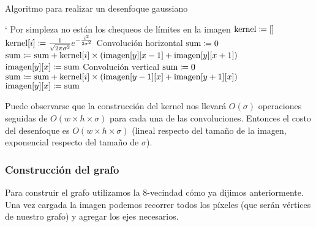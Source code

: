 \begin{algorithm}[H]
\caption{Algoritmo para realizar un desenfoque gaussiano}
\begin{algorithmic}[1]
\Statex{}
`
	\Statex{} \Comment{} Por simpleza no están los chequeos de límites en la imagen
	\State{} $\text{kernel} \coloneqq []$
		\State{} $\text{kernel}[i]
			\coloneqq \frac{1}{\sqrt{2\pi\sigma^2}}e^{-\frac{i^2}{2\sigma^2}}$
	\EndFor{}
		\Comment{} Convolución horizontal
			\State{} $\text{sum} \coloneqq 0$
				\State{} $\text{sum} \coloneqq \text{sum}
					+ \text{kernel}[i] \times (
						\text{imagen}[y][x - 1]
						+ \text{imagen}[y][x + 1]
					)$
			\EndFor{}
			\State{} $\text{imagen}[y][x] \coloneqq \text{sum}$
		\EndFor{}
	\EndFor{}
		\Comment{} Convolución vertical
			\State{} $\text{sum} \coloneqq 0$
				\State{} $\text{sum} \coloneqq \text{sum}
					+ \text{kernel}[i] \times (
						\text{imagen}[y - 1][x]
						+ \text{imagen}[y + 1][x]
					)$
			\EndFor{}
			\State{} $\text{imagen}[y][x] \coloneqq \text{sum}$
		\EndFor{}
	\EndFor{}
\EndFunction{}
\end{algorithmic}
\end{algorithm}

Puede observarse que la construcción del kernel nos llevará $O(\sigma)$
operaciones seguidas de $O(w \times h \times \sigma)$ para cada una de las
convoluciones. Entonces el costo del desenfoque es $O(w \times h \times
\sigma)$ (lineal respecto del tamaño de la imagen, exponencial respecto del
tamaño de $\sigma$).

\subsubsection{Construcción del grafo}

Para construir el grafo utilizamos la 8-vecindad cómo ya dijimos anteriormente.
Una vez cargada la imagen podemos recorrer todos los píxeles (que serán
vértices de nuestro grafo) y agregar los ejes necesarios.

